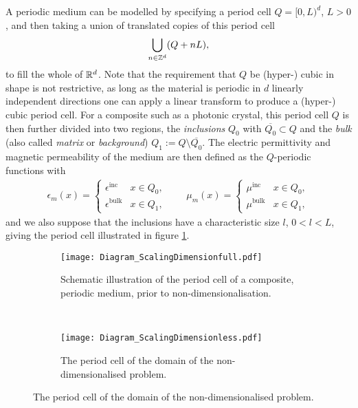 A periodic medium can be modelled by specifying a period cell $Q=[0,L)^d$, $L>0$, and then taking a union of translated copies of this period cell
\begin{align*}
	\bigcup_{n\in\mathbb{Z}^d} (Q + nL),
\end{align*}
to fill the whole of $\mathbb{R}^d$.
Note that the requirement that $Q$ be (hyper-) cubic in shape is not restrictive, as long as the material is periodic in $d$ linearly independent directions one can apply a linear transform to produce a (hyper-) cubic period cell.
For a composite such as a photonic crystal, this period cell $Q$ is then further divided into two regions, the \emph{inclusions} $Q_0$ with $\overline{Q_0}\subset Q$ and the \emph{bulk} (also called \emph{matrix} or \emph{background}) $Q_1:=Q\setminus \overline{Q_0}$.
The electric permittivity and magnetic permeability of the medium are then defined as the $Q$-periodic functions with
\begin{align*}
	\epsilon_m(x) = \begin{cases} \epsilon^{\mathrm{inc}} & x\in Q_0, \\ \epsilon^{\mathrm{bulk}} & x\in Q_1, \end{cases}
	\qquad
	\mu_m(x) = \begin{cases} \mu^{\mathrm{inc}} & x\in Q_0, \\ \mu^{\mathrm{bulk}} & x\in Q_1, \end{cases}
\end{align*}
and we also suppose that the inclusions have a characteristic size $l$, $0<l<L$, giving the period cell illustrated in figure \ref{fig:Diagram_ScalingDimensionfull}.
\begin{figure}[t]
	\centering
	\begin{subfigure}[t]{0.45\textwidth}
		\centering
		\texttt{[image: Diagram\_ScalingDimensionfull.pdf]}
		\caption{\label{fig:Diagram_ScalingDimensionfull} Schematic illustration of the period cell of a composite, periodic medium, prior to non-dimensionalisation.}
	\end{subfigure}
	~
	\begin{subfigure}[t]{0.45\textwidth}
		\centering
		\texttt{[image: Diagram\_ScalingDimensionless.pdf]}
		\caption{\label{fig:Diagram_ScalingDimensionless} The period cell of the domain of the non-dimensionalised problem.}
	\end{subfigure}
\end{figure}

